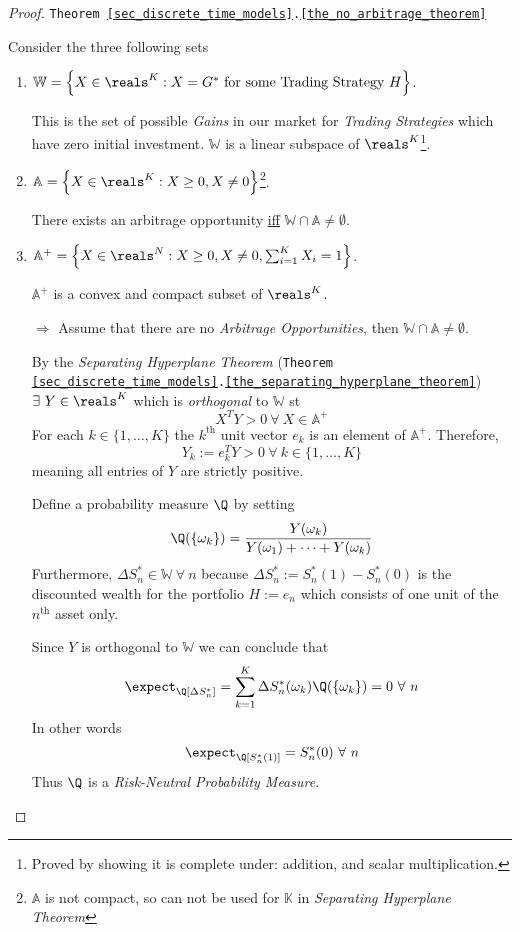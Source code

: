 \documentclass[11pt,a4paper]{article}
\begin{document}
  \begin{proof}{\texttt{Theorem \ref{sec_discrete_time_models}.\ref{the_no_arbitrage_theorem}}}
    \par Consider the three following sets
    \begin{enumerate}
      \item $\mathbb{W}=\left\{X\in\reals^K:X=G^*\text{ for some Trading Strategy }H\right\}$.
      \par This is the set of possible \textit{Gains} in our market for \textit{Trading Strategies} which have zero initial investment. $\mathbb{W}$ is a linear subspace of $\reals^K$\footnote{Proved by showing it is complete under: addition, and scalar multiplication.}.
      \item $\mathbb{A}=\left\{X\in\reals^K:X\geq0,X\neq0\right\}$\footnote{$\mathbb{A}$ is not compact, so can not be used for $\mathbb{K}$ in \textit{Separating Hyperplane Theorem}}.
      \par There exists an arbitrage opportunity \underline{iff} $\mathbb{W}\cap\mathbb{A}\neq\emptyset$.
      \item $\mathbb{A}^+=\left\{X\in\reals^N:X\geq0,X\neq0,\sum_{i=1}^KX_i=1\right\}$.
      \par $\mathbb{A}^+$ is a convex and compact subset of $\reals^K$.
    \end{enumerate}
    \begin{itemize}
      \item[$\Rightarrow$] Assume that there are no \textit{Arbitrage Opportunities}, then $\mathbb{W}\cap\mathbb{A}\neq\emptyset$. \par By the \textit{Separating Hyperplane Theorem} (\texttt{Theorem \ref{sec_discrete_time_models}.\ref{the_separating_hyperplane_theorem}}) $\exists\ Y\in\reals^K$ which is \textit{orthogonal} to $\mathbb{W}$ st
      \[ X^TY>0\ \forall\ X\in\mathbb{A}^+ \]
      For each $k\in\{1,\dots,K\}$ the $k^\text{th}$ unit vector $e_k$ is an element of $\mathbb{A}^+$. Therefore,
      \[ Y_k:=e_k^TY>0\ \forall\ k\in\{1,\dots,K\} \]
      meaning all entries of $Y$ are strictly positive.
      \par Define a probability measure $\Q$ by setting
      \[ \Q(\{\omega_k\})=\frac{Y(\omega_k)}{Y(\omega_1)+\dots+Y(\omega_k)} \]
      Furthermore, $\Delta S_n^*\in\mathbb{W}\ \forall\ n$ because $\Delta S_n^*:=S_n^*(1)-S_n^*(0)$ is the discounted wealth for the portfolio $H:=e_n$ which consists of one unit of the $n^\text{th}$ asset only.
      \par Since $Y$ is orthogonal to $\mathbb{W}$ we can conclude that
      \[ \expect_\Q[\Delta S_n^*]=\sum_{k=1}^K\Delta S_n^*(\omega_k)\Q(\{\omega_k\})=0\ \forall\ n \]
      In other words
      \[ \expect_\Q[S_n^*(1)]=S_n^*(0)\ \forall\ n \]
      Thus $\Q$ is a \textit{Risk-Neutral Probability Measure}.


\end{itemize}
\end{proof}
\end{document}
